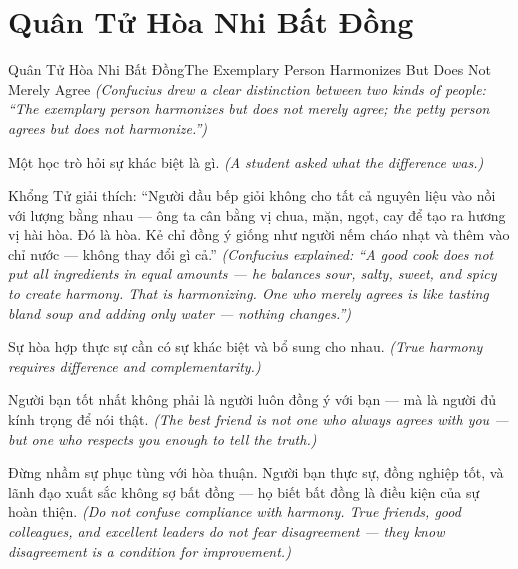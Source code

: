 \section{Quân Tử Hòa Nhi Bất Đồng}
\begin{truyen}{Quân Tử Hòa Nhi Bất Đồng}{The Exemplary Person Harmonizes But Does Not Merely Agree}
\textit{(Confucius drew a clear distinction between two kinds of people: ``The exemplary person harmonizes but does not merely agree; the petty person agrees but does not harmonize.'')}

Một học trò hỏi sự khác biệt là gì.
\textit{(A student asked what the difference was.)}

Khổng Tử giải thích: ``Người đầu bếp giỏi không cho tất cả nguyên liệu vào nồi với lượng bằng nhau — ông ta cân bằng vị chua, mặn, ngọt, cay để tạo ra hương vị hài hòa. Đó là hòa. Kẻ chỉ đồng ý giống như người nếm cháo nhạt và thêm vào chỉ nước — không thay đổi gì cả.''
\textit{(Confucius explained: ``A good cook does not put all ingredients in equal amounts — he balances sour, salty, sweet, and spicy to create harmony. That is harmonizing. One who merely agrees is like tasting bland soup and adding only water — nothing changes.'')}

Sự hòa hợp thực sự cần có sự khác biệt và bổ sung cho nhau.
\textit{(True harmony requires difference and complementarity.)}

Người bạn tốt nhất không phải là người luôn đồng ý với bạn — mà là người đủ kính trọng để nói thật.
\textit{(The best friend is not one who always agrees with you — but one who respects you enough to tell the truth.)}

\end{truyen}

\begin{baihoc}
Đừng nhầm sự phục tùng với hòa thuận. Người bạn thực sự, đồng nghiệp tốt, và lãnh đạo xuất sắc không sợ bất đồng — họ biết bất đồng là điều kiện của sự hoàn thiện.
\textit{(Do not confuse compliance with harmony. True friends, good colleagues, and excellent leaders do not fear disagreement — they know disagreement is a condition for improvement.)}
\end{baihoc}
\ngancach


